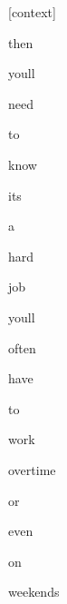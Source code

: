 \documentclass[varwidth]{standalone}
\begin{document}
\begin{CJK*}{UTF8}{gbsn}
{\setlength{\fboxsep}{0pt}\colorbox{white!0}{\parbox{0.9\textwidth}{
\colorbox{red!2.3126391481085445e-14}{\strut [context]} \colorbox{red!9.051686511440948e-09}{\strut then} \colorbox{red!5.857613771809156e-08}{\strut youll} \colorbox{red!7.021525760819713e-08}{\strut need} \colorbox{red!3.6342129305921844e-07}{\strut to} \colorbox{red!9.695315839053364e-08}{\strut know} \colorbox{red!8.787305318946892e-07}{\strut its} \colorbox{red!1.687244548520539e-07}{\strut a} \colorbox{red!0.0012400592677295208}{\strut hard} \colorbox{red!0.22139975428581238}{\strut job} \colorbox{red!0.364592969417572}{\strut youll} \colorbox{red!0.06527023762464523}{\strut often} \colorbox{red!0.00038223902811296284}{\strut have} \colorbox{red!0.0024254696909338236}{\strut to} \colorbox{red!0.0003460679145064205}{\strut work} \colorbox{red!47.15705490112305}{\strut overtime} \colorbox{red!49.00360107421875}{\strut or} \colorbox{red!2.827629327774048}{\strut even} \colorbox{red!0.3414793312549591}{\strut on} \colorbox{red!0.01458374597132206}{\strut weekends} 
}}}
\end{CJK*}
\end{document}
